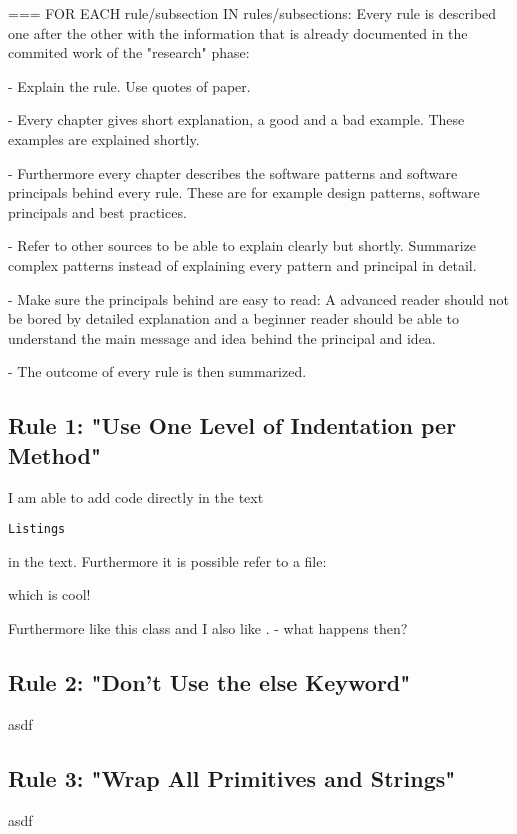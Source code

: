 === FOR EACH rule/subsection IN rules/subsections: 
Every rule is described one after the other with the information that is already documented in the commited work of the "research" phase: 

 - Explain the rule. Use quotes of paper. 
 
 - Every chapter gives short explanation, a good and a bad example. These examples are explained shortly. 
 
 -  Furthermore every chapter describes the software patterns and software principals behind every rule. These are for example design patterns, software principals and best practices. 
 
 - Refer to other sources to be able to explain clearly but shortly. Summarize complex patterns instead of explaining every pattern and principal in detail. 
 
 - Make sure the principals behind are easy to read: A advanced reader should not be bored by detailed explanation and a beginner reader should be able to understand the main message and idea behind the principal and idea.
 
 - The outcome of every rule is then summarized.

\subsection{Rule 1: "Use One Level of Indentation per Method"}
I am able to add code directly in the text 

\begin{lstlisting}
Listings
\end{lstlisting}

 in the text. 
Furthermore it is possible refer to a file: 



which is cool!

Furthermore like this class  and I also like .  - what happens then?

\subsection{Rule 2: "Don’t Use the else Keyword"}
asdf
\subsection{Rule 3: "Wrap All Primitives and Strings"}
asdf
